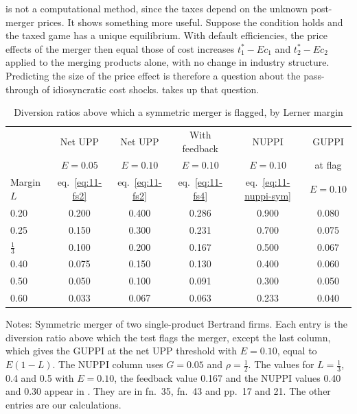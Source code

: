  is not a computational method, since the taxes depend on the unknown post-merger prices. It shows
something more useful. Suppose the condition holds and the taxed game has a unique equilibrium. With default
efficiencies, the price effects of the merger then equal those of cost increases $t_1^* - E c_1$ and $t_2^* - E c_2$
applied to the merging products alone, with no change in industry structure.
Predicting the size of the price effect is therefore a question about the pass-through of idiosyncratic cost shocks.
 takes up that question.

\begin{table}[htbp]
\centering
\caption{Diversion ratios above which a symmetric merger is flagged, by Lerner margin}
\label{tab:11-thresholds}
\small
\begin{tabular}{@{}lccccc@{}}
\toprule
 & Net UPP & Net UPP & With feedback & NUPPI & GUPPI \\
 & $E = 0.05$ & $E = 0.10$ & $E = 0.10$ & $E = 0.10$ & at flag \\
Margin $L$ & eq.~\eqref{eq:11-fs2} & eq.~\eqref{eq:11-fs2} & eq.~\eqref{eq:11-fs4} & eq.~\eqref{eq:11-nuppi-sym} & $E = 0.10$ \\
\midrule
0.20          & 0.200 & 0.400 & 0.286 & 0.900 & 0.080 \\
0.25          & 0.150 & 0.300 & 0.231 & 0.700 & 0.075 \\
$\frac{1}{3}$ & 0.100 & 0.200 & 0.167 & 0.500 & 0.067 \\
0.40          & 0.075 & 0.150 & 0.130 & 0.400 & 0.060 \\
0.50          & 0.050 & 0.100 & 0.091 & 0.300 & 0.050 \\
0.60          & 0.033 & 0.067 & 0.063 & 0.233 & 0.040 \\
\bottomrule
\end{tabular}

\smallskip
\begin{minipage}{0.92\linewidth}
\footnotesize
Notes: Symmetric merger of two single-product Bertrand firms. Each entry is the diversion ratio above which the test
flags the merger, except the last column, which gives the GUPPI at the net UPP threshold with $E = 0.10$, equal to
$E(1 - L)$. The NUPPI column uses $G = 0.05$ and $\rho = \frac{1}{2}$. The values for $L = \frac{1}{3}$, 0.4 and 0.5
with $E = 0.10$, the feedback value 0.167 and the NUPPI values 0.40 and 0.30 appear in \citet{FarrellShapiro2010}.
They are in fn.~35, fn.~43 and pp.~17 and 21. The other entries are our calculations.
\end{minipage}
\end{table}

